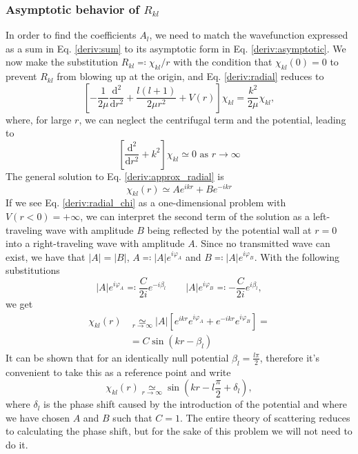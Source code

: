 \subsubsection{Asymptotic behavior of \(R_{kl} \)}
In order to find the coefficients \(A_l\), we need to match the wavefunction expressed as a sum in Eq. \eqref{deriv:sum} to its asymptotic form in Eq. \eqref{deriv:asymptotic}. We now make the substitution \(R_{kl} \eqqcolon \chi_{kl} / r\) with the condition that \(\chi_{kl} (0)=0\) to prevent \(R_{kl} \) from blowing up at the origin, and Eq. \eqref{deriv:radial} reduces to
\begin{equation}\label{deriv:radial_chi}
	\left[- \frac{1}{2\mu }\frac{\mathrm{d}^2}{\mathrm{d}r^2} + \frac{l(l+1)}{2\mu r^2}+ V(r)\right]\chi_{kl} = \frac{k^2}{2\mu }\chi_{kl},
\end{equation}
where, for large \(r\), we can neglect the centrifugal term and the potential, leading to
\begin{equation}\label{deriv:approx_radial}
	\left[ \frac{\mathrm{d}^2}{\mathrm{d}r^2} + k^2  \right] \chi_{kl}  \simeq 0 \text{ as } r \to \infty 
\end{equation}
The general solution to Eq. \eqref{deriv:approx_radial} is
\begin{equation}
	\chi_{kl} (r) \simeq A e^{ikr} + B e^{-ikr}
\end{equation}
If we see Eq. \eqref{deriv:radial_chi} as a one-dimensional problem with \(V(r < 0) = +\infty \), we can interpret the second term of the solution as a left-traveling wave with amplitude \(B\) being reflected by the potential wall at \(r=0\) into a right-traveling wave with amplitude \(A\). Since no transmitted wave can exist, we have that \(\vert A \vert = \vert B \vert \), \(A\eqqcolon \vert A \vert e^{i\varphi_A} \) and \(B \eqqcolon  \vert A \vert e^{i\varphi_B}\). With the following substitutions
\begin{equation}
	\vert A \vert e^{i \varphi_A} \eqqcolon \frac{C}{2i} e^{-i \beta_l}
	\qquad
	\vert A \vert e^{i \varphi _B} \eqqcolon - \frac{C}{2i} e^{i \beta _l},
\end{equation}
we get
\begin{align}
	\chi_{kl}(r) &\underset{r \to \infty }{\simeq} \vert A \vert \left[ e^{ikr} e^{i \varphi_A}+ e^{-ikr} e^{i \varphi_B} \right] =\\
	&= C \sin (kr - \beta _l)
\end{align}
It can be shown \cite{cohen-tannoudji} that for an identically null potential \(\beta _l = \frac{l \pi }{2}\), therefore it's convenient to take this as a reference point and write
\begin{equation}\label{deriv:chi_asymptotic}
	\chi_{kl} (r) \underset{r \to \infty }{\simeq} \sin\left(kr- l \frac{\pi}{2} + \delta _l\right),
\end{equation}
where \(\delta _l\) is the phase shift caused by the introduction of the potential and where we have chosen \(A\) and \(B\) such that \(C=1\). The entire theory of scattering reduces to calculating the phase shift, but for the sake of this problem we will not need to do it.

